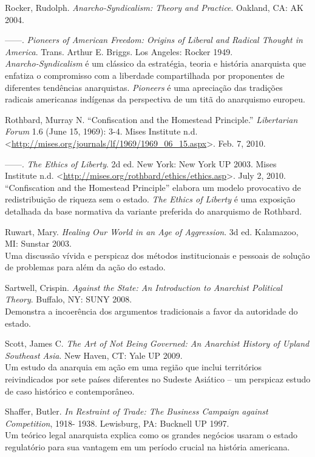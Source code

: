 \begin{hangparas}{0.25in}{1}
Rocker, Rudolph. \emph{Anarcho-Syndicalism: Theory and Practice}. Oakland, CA: AK 2004.

------. \emph{Pioneers of American Freedom: Origins of Liberal and Radical Thought in America}. Trans. Arthur E. Briggs. Los Angeles: Rocker 1949.\smallskip\\
\emph{Anarcho-Syndicalism} é um clássico da estratégia, teoria e história anarquista que enfatiza o compromisso com a liberdade compartilhada por proponentes de diferentes tendências anarquistas. \emph{Pioneers} é uma apreciação das tradições radicais americanas indígenas da perspectiva de um titã do anarquismo europeu.

Rothbard, Murray N. ``Confiscation and the Homestead Principle.'' \emph{Libertarian Forum} 1.6 (June 15, 1969): 3-4. Mises Institute n.d. <\url{http://mises.org/journals/lf/1969/1969_06_15.aspx}>. Feb. 7, 2010.

------. \emph{The Ethics of Liberty}. 2d ed. New York: New York UP 2003. Mises Institute n.d. <\url{http://mises.org/rothbard/ethics/ethics.asp}>. July 2, 2010.\smallskip\\
``Confiscation and the Homestead Principle'' elabora um modelo provocativo de redistribuição de riqueza sem o estado. \emph{The Ethics of Liberty} é uma exposição detalhada da base normativa da variante preferida do anarquismo de Rothbard.

Ruwart, Mary. \emph{Healing Our World in an Age of Aggression}. 3d ed. Kalamazoo, MI: Sunstar 2003.\smallskip\\
Uma discussão vívida e perspicaz dos métodos institucionais e pessoais de solução de problemas para além da ação do estado.

Sartwell, Crispin. \emph{Against the State: An Introduction to Anarchist Political Theory}. Buffalo, NY: SUNY 2008.\smallskip\\
Demonstra a incoerência dos argumentos tradicionais a favor da autoridade do estado.

Scott, James C. \emph{The Art of Not Being Governed: An Anarchist History of Upland Southeast Asia}. New Haven, CT: Yale UP 2009.\smallskip\\
Um estudo da anarquia em ação em uma região que inclui territórios reivindicados por sete países diferentes no Sudeste Asiático -- um perspicaz estudo de caso histórico e contemporâneo.

Shaffer, Butler. \emph{In Restraint of Trade: The Business Campaign against Competition}, 1918- 1938. Lewisburg, PA: Bucknell UP 1997.\smallskip\\
Um teórico legal anarquista explica como os grandes negócios usaram o estado regulatório para sua vantagem em um período crucial na história americana.


\end{hangparas}
